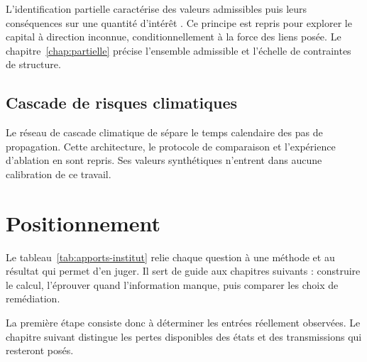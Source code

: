 L'identification partielle caractérise des valeurs admissibles puis leurs conséquences sur une
quantité d'intérêt \citep{Manski1990,Manski1995,Tamer2010}. Ce principe est repris pour
explorer le capital à direction inconnue, conditionnellement à la force des liens posée.
Le chapitre~\ref{chap:partielle} précise l'ensemble admissible et l'échelle de contraintes de structure.

\subsection*{Cascade de risques climatiques}
Le réseau de cascade climatique de \citet{ccrn2026} sépare le temps calendaire des pas de
propagation. Cette architecture, le protocole de comparaison et l'expérience d'ablation en sont
repris. Ses valeurs synthétiques n'entrent dans aucune calibration de ce travail.

\section{Positionnement}

Le tableau~\ref{tab:apports-institut} relie chaque question à une méthode et au résultat qui
permet d'en juger. Il sert de guide aux chapitres suivants : construire le calcul, l'éprouver
quand l'information manque, puis comparer les choix de remédiation.



La première étape consiste donc à déterminer les entrées réellement observées. Le chapitre
suivant distingue les pertes disponibles des états et des transmissions qui resteront posés.

\nocite{BohmeKataria2006, HerathHerath2011, HillairetLopez2021,
  HillairetLopezDOultremontSpoorenberg2022, XuHua2017, Baldwin2017,
  BessyRolandBoumezouedHillairet2021, BoumezouedCherkaouiHillairet2023,
  HillairetReveillacRosenbaum2021, Peng2016, Edwards2016, LuZhangZhu2024,
  FarkasLopezThomas2021, Vasicek2002, Leontief1936}
